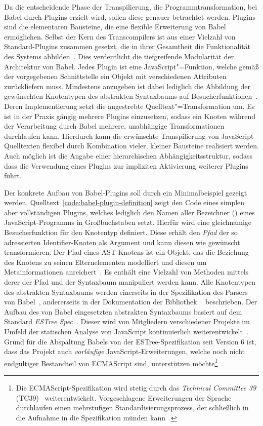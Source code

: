 Da die entscheidende Phase der Transpilierung, die Programmtransformation, bei Babel durch Plugins erzielt wird, sollen diese genauer betrachtet werden. Plugins sind die elementaren Bausteine, die eine flexible Erweiterung von Babel ermöglichen. Selbst der Kern des Transcompilers ist aus einer Vielzahl von Standard-Plugins zusammen gesetzt, die in ihrer Gesamtheit die Funktionalität des Systems abbilden~\autocite{BABEL}. Dies verdeutlicht die tiefgreifende Modularität der Architektur von Babel. Jedes Plugin ist eine JavaScript"=Funktion, welche gemäß der vorgegebenen Schnittstelle ein Objekt mit verschiedenen Attributen zurückliefern muss. Mindestens anzugeben ist dabei lediglich die Abbildung der gewünschten Knotentypen des abstrakten Syntaxbaums auf Besucherfunktionen~\autocite{BABEL:HANDBOOK}. Deren Implementierung setzt die angestrebte Quelltext"=Transformation um. Es ist in der Praxis gängig mehrere Plugins einzusetzen, sodass ein Knoten während der Verarbeitung durch Babel mehrere, unabhängige Transformationen durchlaufen kann. Hierdurch kann die erwünschte Transpilierung von JavaScript-Quelltexten flexibel durch Kombination vieler, kleiner Bausteine realisiert werden. Auch möglich ist die Angabe einer hierarchischen Abhängigkeitsstruktur, sodass dass die Verwendung eines Plugins zur impliziten Aktivierung weiterer Plugins führt.

Der konkrete Aufbau von Babel-Plugins soll durch ein Minimalbeispiel gezeigt werden. Quelltext~\ref{code:babel-plugin-definition} zeigt den Code eines simplen aber vollständigen Plugins, welches lediglich den Namen aller Bezeichner () eines JavaScript-Programms in Großbuchstaben setzt. Hierfür wird eine gleichnamige Besucherfunktion für den Knotentyp  definiert. Diese erhält den \emph{Pfad} der so adressierten Identifier-Knoten als Argument und kann diesen wie gewünscht transformieren. Der Pfad eines AST-Knotens ist ein Objekt, das die Beziehung des Knotens zu seinen Elternelementen modelliert und diesen um Metainformationen anreichert~\autocite{BABEL:HANDBOOK}. Es enthält eine Vielzahl von Methoden mittels derer der Pfad und der Syntaxbaum manipuliert werden kann.
Alle Knotentypen des abstrakten Syntaxbaums werden einerseits in der Spezifikation des Parsers von Babel~\autocite{BABEL:PARSER_SPEC,BABEL:PARSER}, andererseits in der Dokumentation der Bibliothek ~\autocite{BABEL:TYPES} beschrieben. Der Aufbau des von Babel eingesetzten abstrakten Syntaxbaums basiert auf dem Standard \textit{ESTree Spec}~\autocite{ESTREE_SPEC}. Dieser wird von Mitgliedern verschiedener Projekte im Umfeld der statischen Analyse von JavaScript kontinuierlich weiterentwickelt~\autocite{BABEL:PARSER,ESTREE_SPEC}. Grund für die Abspaltung Babels von der ESTree-Spezifikation seit Version 6 ist, dass das Projekt auch \emph{vorläufige} JavaScript-Erweiterungen, welche noch nicht endgültiger Bestandteil von ECMAScript sind, unterstützen möchte\footnote{Die ECMAScript-Spezifikation wird stetig durch das \textit{Technical Committee 39} (TC39)~\autocite{TC39_COMMITTEE} weiterentwickelt. Vorgeschlagene Erweiterungen der Sprache durchlaufen einen mehrstufigen Standardisierungsprozess, der schließlich in die Aufnahme in die Spezifikation münden kann~\autocite{TC39_PROCESS}.}~\autocite{BABEL:STATE_OF_BABEL}.

